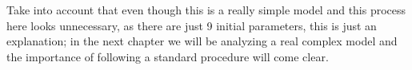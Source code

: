  Take into account that even though this is a really simple model and this process here looks unnecessary, as there are just 9 initial parameters, this is just an explanation; in the next chapter we will be analyzing a real complex model and the importance of following a standard procedure will come clear.




















